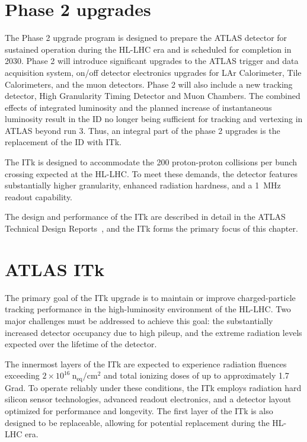 \section{Phase 2 upgrades}


The Phase 2 upgrade program is designed to prepare the ATLAS detector for sustained operation during the HL-LHC era and is scheduled for completion in 2030. 
Phase 2 will introduce significant upgrades to the ATLAS trigger and data acquisition system, on/off detector electronics upgrades for LAr Calorimeter, Tile Calorimeters, and the muon detectors. 
Phase 2 will also include a new tracking detector, High Granularity Timing Detector and Muon Chambers.  
The combined effects of integrated luminosity and the planned increase of instantaneous luminosity result in the ID no longer being sufficient for tracking and vertexing in ATLAS beyond run 3. Thus, an integral part of the phase 2 upgrades is the replacement of the ID with ITk. 

The ITk is designed to accommodate the 200 proton-proton collisions per bunch crossing expected at the HL-LHC. 
To meet these demands, the detector features substantially higher granularity, enhanced radiation hardness, and a 1~MHz readout capability.


The design and performance of the ITk are described in detail in the ATLAS Technical Design Reports~\cite{ATLASITkTDR1,ATLASITkTDR2}, and the ITk forms the primary focus of this chapter.


 
\section{ATLAS ITk}



The primary goal of the ITk upgrade is to maintain or improve charged-particle tracking performance in the high-luminosity environment of the HL-LHC. 
Two major challenges must be addressed to achieve this goal: the substantially increased detector occupancy due to high pileup, and the extreme radiation levels expected over the lifetime of the detector.

The innermost layers of the ITk are expected to experience radiation fluences exceeding
$2 \times 10^{16}~\mathrm{n_{eq}/cm^2}$
and total ionizing doses of up to approximately 1.7 Grad. 
To operate reliably under these conditions, the ITk employs radiation hard silicon sensor technologies, advanced readout electronics, and a detector layout optimized for performance and longevity.
The first layer of the ITk is also designed to be replaceable, allowing for potential replacement during the HL-LHC era. 

